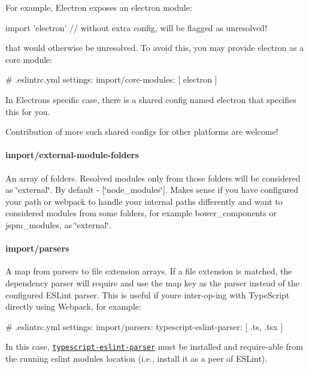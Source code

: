 For example, Electron exposes an {\ttfamily electron} module\+:


\begin{DoxyCode}
import 'electron'  // without extra config, will be flagged as unresolved!
\end{DoxyCode}


that would otherwise be unresolved. To avoid this, you may provide {\ttfamily electron} as a core module\+:


\begin{DoxyCode}
# .eslintrc.yml
settings:
  import/core-modules: [ electron ]
\end{DoxyCode}


In Electron\textquotesingle{}s specific case, there is a shared config named {\ttfamily electron} that specifies this for you.

Contribution of more such shared configs for other platforms are welcome!

\paragraph*{{\ttfamily import/external-\/module-\/folders}}

An array of folders. Resolved modules only from those folders will be considered as \char`\"{}external\char`\"{}. By default -\/ {\ttfamily \mbox{[}\char`\"{}node\+\_\+modules\char`\"{}\mbox{]}}. Makes sense if you have configured your path or webpack to handle your internal paths differently and want to considered modules from some folders, for example {\ttfamily bower\+\_\+components} or {\ttfamily jspm\+\_\+modules}, as \char`\"{}external\char`\"{}.

\paragraph*{{\ttfamily import/parsers}}

A map from parsers to file extension arrays. If a file extension is matched, the dependency parser will require and use the map key as the parser instead of the configured E\+S\+Lint parser. This is useful if you\textquotesingle{}re inter-\/op-\/ing with Type\+Script directly using Webpack, for example\+:


\begin{DoxyCode}
# .eslintrc.yml
settings:
  import/parsers:
    typescript-eslint-parser: [ .ts, .tsx ]
\end{DoxyCode}


In this case, \href{https://github.com/eslint/typescript-eslint-parser}{\tt {\ttfamily typescript-\/eslint-\/parser}} must be installed and require-\/able from the running {\ttfamily eslint} module\textquotesingle{}s location (i.\+e., install it as a peer of E\+S\+Lint).

